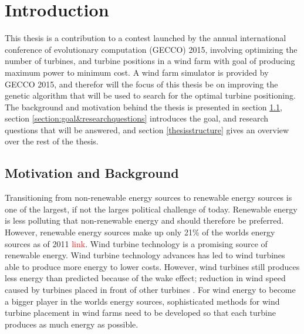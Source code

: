 \chapter{Introduction}
This thesis is a contribution to a contest launched by the annual international conference of evolutionary computation (GECCO) 2015, involving optimizing the number of turbines, and turbine positions in a wind farm with goal of producing maximum power to minimum cost. A wind farm simulator is provided by GECCO 2015, and therefor will the focus of this thesis be on improving the genetic algorithm that will be used to search for the optimal turbine positioning. The background and motivation behind the thesis is presented in section \ref{section:motivation&background}, section \ref{section:goal&researchquestions} introduces the goal, and research questions that will be answered, and section \ref{thesisstructure} gives an overview over the rest of the thesis. 


\section{Motivation and Background}\label{section:motivation&background}
Transitioning from non-renewable energy sources to renewable energy sources is one of the largest, if not the larges political challenge of today. Renewable energy is less polluting that non-renewable energy and should therefore be preferred. However, renewable energy sources make up only 21\% of the worlds energy sources as of 2011 \textcolor{red}{link}. Wind turbine technology is a promising source of renewable energy. Wind turbine technology advances has led to wind turbines able to produce more energy to lower costs. However, wind turbines still produces less energy than predicted because of the wake effect; reduction in wind speed caused by turbines placed in front of other turbines \citep{Samorani}. For wind energy to become a bigger player in the worlds energy sources, sophisticated methods for wind turbine placement in wind farms need to be developed so that each turbine produces as much energy as possible. \\

